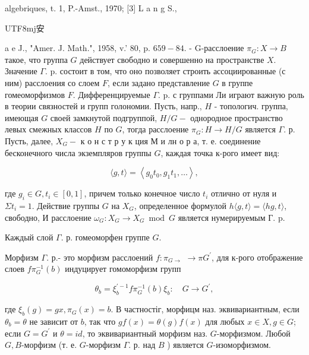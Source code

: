 \documentclass[10pt]{article}
\begin{document}
algebriques, t. 1, P.-Amst., 1970; [3] L a n g S., \begin{CJK}{UTF8}{mj}安\end{CJK} a e J., "Amer. J. Math.", 1958, v.' 80, p. $659-84$. - G-расслоение $\pi_{G}: X \rightarrow B$ такое, что группа $G$ действует свободно и совершенно на пространстве $X$. Значение $\Gamma$. $\mathrm{p}$. состоит в том, что оно позволяет строить ассоциированные (с ним) расслоения со слоем $F$, если задано представление $G$ в группе гомеоморфизмов $F$. Дифференцируемые $\Gamma$. p. с группами Ли играют важную роль в теории связностей и групп голономии. Пусть, напр., $H$ - топологич. группа, имеющая $G$ своей замкнутой подгруппой, $H / G-$ однородное пространство левых смежных классов $H$ по $G$, тогда расслоение $\pi_{G}: H \rightarrow H / G$ является $\Gamma$. р. Пусть, далее, $X_{G}-$ к о н с т р у к ция М и лн о р а, т. е. соединение бесконечного числа экземпляров группы $G$, каждая точка к-рого имеет вид:



\[

\langle g, t\rangle=\left\langle g_{0} t_{0}, g_{1} t_{1}, \ldots\right\rangle,

\]



где $g_{i} \in G, t_{i} \in[0,1]$, причем только конечное число $t_{i}$ отлично от нуля и $\Sigma t_{i}=1$. Действие группы $G$ на $X_{G}$, определенное формулой $h\langle g, t\rangle=\langle h g, t\rangle$, свободно, И расслоение $\omega_{G}: X_{G} \rightarrow X_{G} \bmod G$ является нумерируемым Г. p.



Каждый слой $\Gamma$. р. гомеоморфен группе $G$.



Морфизм $\Gamma$. р.- это морфизм расслоений $f: \pi_{G \rightarrow}$ $\rightarrow \pi G^{\prime}$, для к-рого отображение слоев $f \pi_{G}^{-1}(b)$ индуцирует гомоморфизм групп



\[

\theta_{b}=\xi_{b}^{\prime-1} f \pi_{G}^{-1}(b) \xi_{b}: \quad G \rightarrow G^{\prime},

\]



где $\xi_{b}(g)=g x, \pi_{G}(x)=b$. В частностіг, морфицм наз. эквивариантным, если $\theta_{b}=\theta$ не зависит от $b$, так что $g f(x)=\theta(g) f(x)$ для любых $x \in X, g \in G$; если $G=G^{\prime}$ и $\theta=i d$, то эквивариантный морфизм наз. $G$-морфизмом. Любой $G, B$-морфизм (т. е. $G$-морфизм $\Gamma$. р. над $B$ ) является $G$-изоморфизмом.
\end{document}
